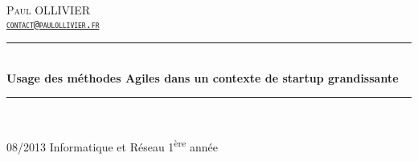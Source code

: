 \newcommand{\HRule}{\rule{\linewidth}{0.5mm}}
\begin{titlepage}
\begin{center}


\hfill\textsc{\LARGE{Paul OLLIVIER}\\
\hfill\href{mailto:contact@paulollivier.fr}{\texttt{contact@paulollivier.fr}}}

\vfill

\HRule \\[0.4cm]
{ \huge \bfseries Usage des méthodes Agiles dans un contexte de startup grandissante\\[0.4cm] }

\HRule \\[1.5cm]
\vfill

{\large 08/2013 \hfill Informatique et Réseau 1\textsuperscript{ère} année}

\end{center}
\end{titlepage}
